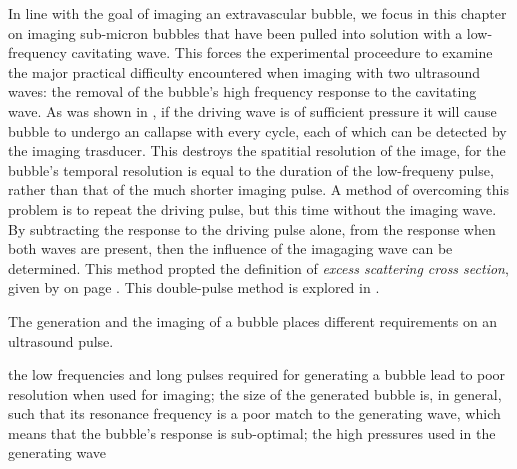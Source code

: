 In line with the goal of imaging an extravascular bubble,
we focus in this chapter on imaging sub-micron bubbles 
that have been pulled into solution with a low-frequency cavitating wave.
This forces the experimental proceedure to 
examine the major practical difficulty encountered when imaging with two ultrasound waves:
the removal of the  bubble's high frequency response to the cavitating wave.
As was shown in ,
if the driving wave is of sufficient pressure 
it will cause bubble to undergo an callapse with every cycle,
each of which  can be detected by the imaging trasducer.
This destroys the spatitial resolution of the image,
for the bubble's temporal resolution is equal to the  duration of the low-frequeny pulse,
rather than that of the much shorter imaging pulse.
A method of overcoming this problem is to repeat the driving pulse,
but this time without the imaging wave.
By subtracting the response to the driving pulse alone,
from the response when both waves are present,
then the influence of the imagaging wave can be determined.
This method propted the definition of {\em excess scattering cross section},
given by  on page \pageref{eqn:excessI}.
This double-pulse method is explored in .












The generation and the imaging of a bubble places different requirements on an ultrasound pulse.

the low frequencies and long pulses required for generating a bubble lead to poor resolution 
when used for imaging;
the size of the generated bubble is, in general,
such that its resonance frequency is a poor match to the generating wave,
which means that the bubble's response is sub-optimal;
the high pressures used in the generating wave 



